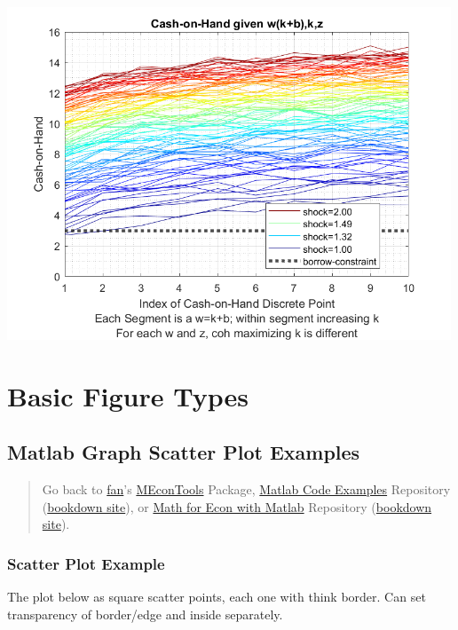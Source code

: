 \documentclass[
]{book}
\begin{document}
\includegraphics[width=5.20833in,height=\textheight]{img/fs_legendsubset_images/figure_0.png}

\hypertarget{basic-figure-types}{%
\section{Basic Figure Types}\label{basic-figure-types}}

\hypertarget{matlab-graph-scatter-plot-examples}{%
\subsection{Matlab Graph Scatter Plot Examples}\label{matlab-graph-scatter-plot-examples}}

\begin{quote}
Go back to \href{http://fanwangecon.github.io/}{fan}'s \href{https://fanwangecon.github.io/MEconTools/}{MEconTools} Package, \href{https://fanwangecon.github.io/M4Econ/}{Matlab Code Examples} Repository (\href{https://fanwangecon.github.io/M4Econ/bookdown}{bookdown site}), or \href{https://fanwangecon.github.io/Math4Econ/}{Math for Econ with Matlab} Repository (\href{https://fanwangecon.github.io/Math4Econ/bookdown}{bookdown site}).
\end{quote}

\hypertarget{scatter-plot-example}{%
\subsubsection{Scatter Plot Example}\label{scatter-plot-example}}

The plot below as square scatter points, each one with think border. Can
set transparency of border/edge and inside separately.
\end{document}
